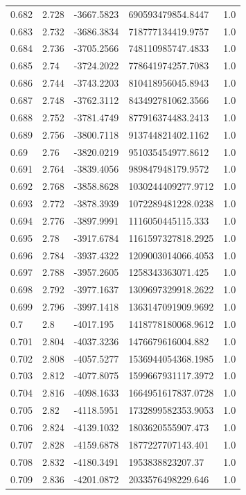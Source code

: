 \begin{tabular}{lllll}
0.682 & 2.728 & -3667.5823 & 690593479854.8447 & 1.0 \\
0.683 & 2.732 & -3686.3834 & 718777134419.9757 & 1.0 \\
0.684 & 2.736 & -3705.2566 & 748110985747.4833 & 1.0 \\
0.685 & 2.74 & -3724.2022 & 778641974257.7083 & 1.0 \\
0.686 & 2.744 & -3743.2203 & 810418956045.8943 & 1.0 \\
0.687 & 2.748 & -3762.3112 & 843492781062.3566 & 1.0 \\
0.688 & 2.752 & -3781.4749 & 877916374483.2413 & 1.0 \\
0.689 & 2.756 & -3800.7118 & 913744821402.1162 & 1.0 \\
0.69 & 2.76 & -3820.0219 & 951035454977.8612 & 1.0 \\
0.691 & 2.764 & -3839.4056 & 989847948179.9572 & 1.0 \\
0.692 & 2.768 & -3858.8628 & 1030244409277.9712 & 1.0 \\
0.693 & 2.772 & -3878.3939 & 1072289481228.0238 & 1.0 \\
0.694 & 2.776 & -3897.9991 & 1116050445115.333 & 1.0 \\
0.695 & 2.78 & -3917.6784 & 1161597327818.2925 & 1.0 \\
0.696 & 2.784 & -3937.4322 & 1209003014066.4053 & 1.0 \\
0.697 & 2.788 & -3957.2605 & 1258343363071.425 & 1.0 \\
0.698 & 2.792 & -3977.1637 & 1309697329918.2622 & 1.0 \\
0.699 & 2.796 & -3997.1418 & 1363147091909.9692 & 1.0 \\
0.7 & 2.8 & -4017.195 & 1418778180068.9612 & 1.0 \\
0.701 & 2.804 & -4037.3236 & 1476679616004.882 & 1.0 \\
0.702 & 2.808 & -4057.5277 & 1536944054368.1985 & 1.0 \\
0.703 & 2.812 & -4077.8075 & 1599667931117.3972 & 1.0 \\
0.704 & 2.816 & -4098.1633 & 1664951617837.0728 & 1.0 \\
0.705 & 2.82 & -4118.5951 & 1732899582353.9053 & 1.0 \\
0.706 & 2.824 & -4139.1032 & 1803620555907.473 & 1.0 \\
0.707 & 2.828 & -4159.6878 & 1877227707143.401 & 1.0 \\
0.708 & 2.832 & -4180.3491 & 1953838823207.37 & 1.0 \\
0.709 & 2.836 & -4201.0872 & 2033576498229.646 & 1.0 \\

\end{tabular}
